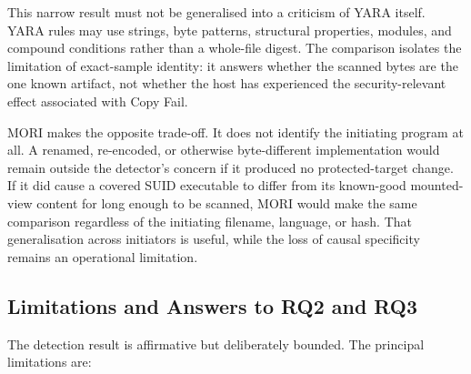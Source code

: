 This narrow result must not be generalised into a criticism of YARA itself.
YARA rules may use strings, byte patterns, structural properties, modules, and
compound conditions rather than a whole-file digest. The comparison isolates
the limitation of exact-sample identity: it answers whether the scanned bytes
are the one known artifact, not whether the host has experienced the
security-relevant effect associated with Copy Fail.

MORI makes the opposite trade-off. It does not identify the initiating program
at all. A renamed, re-encoded, or otherwise byte-different implementation would
remain outside the detector's concern if it produced no protected-target
change. If it did cause a covered SUID executable to differ from its
known-good mounted-view content for long enough to be scanned, MORI would make
the same comparison regardless of the initiating filename, language, or hash.
That generalisation across initiators is useful, while the loss of causal
specificity remains an operational limitation.

\subsection{Limitations and Answers to RQ2 and RQ3}

The detection result is affirmative but deliberately bounded. The principal
limitations are:

